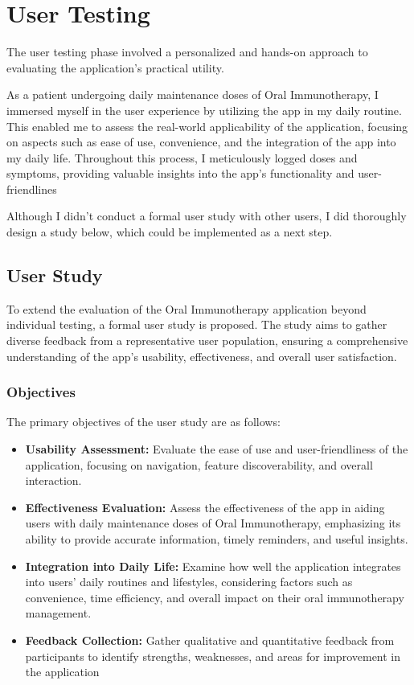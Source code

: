\section{User Testing}

The user testing phase involved a personalized and hands-on approach to evaluating the application's practical utility.

As a patient undergoing daily maintenance doses of Oral Immunotherapy, I immersed myself in the user experience by utilizing the app in my daily routine. This enabled me to assess the real-world applicability of the application, focusing on aspects such as ease of use, convenience, and the integration of the app into my daily life. Throughout this process, I meticulously logged doses and symptoms, providing valuable insights into the app's functionality and user-friendlines

Although I didn't conduct a formal user study with other users, I did thoroughly design a study below, which could be implemented as a next step.

\subsection{User Study}

To extend the evaluation of the Oral Immunotherapy application beyond individual testing, a formal user study is proposed. The study aims to gather diverse feedback from a representative user population, ensuring a comprehensive understanding of the app's usability, effectiveness, and overall user satisfaction.

\subsubsection{Objectives}

The primary objectives of the user study are as follows:

\begin{itemize}
    \item \textbf{Usability Assessment:} Evaluate the ease of use and user-friendliness of the application, focusing on navigation, feature discoverability, and overall interaction.
    \item \textbf{Effectiveness Evaluation:} Assess the effectiveness of the app in aiding users with daily maintenance doses of Oral Immunotherapy, emphasizing its ability to provide accurate information, timely reminders, and useful insights.
    \item \textbf{Integration into Daily Life: }Examine how well the application integrates into users' daily routines and lifestyles, considering factors such as convenience, time efficiency, and overall impact on their oral immunotherapy management.
    \item \textbf{Feedback Collection:} Gather qualitative and quantitative feedback from participants to identify strengths, weaknesses, and areas for improvement in the application
\end{itemize}

